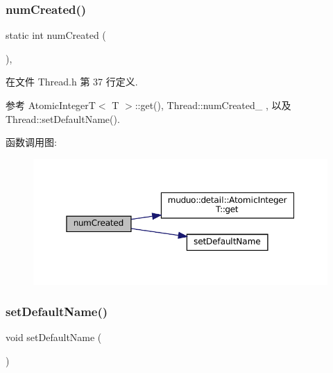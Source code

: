 \subsubsection{\texorpdfstring{num\+Created()}{numCreated()}}
{\footnotesize\ttfamily static int num\+Created (\begin{DoxyParamCaption}{ }\end{DoxyParamCaption})\hspace{0.3cm}{\ttfamily [inline]}, {\ttfamily [static]}}



在文件 Thread.\+h 第 37 行定义.



参考 Atomic\+Integer\+T$<$ T $>$\+::get(), Thread\+::num\+Created\+\_\+ , 以及 Thread\+::set\+Default\+Name().

函数调用图\+:
\nopagebreak
\begin{figure}[H]
\begin{center}
\leavevmode
\includegraphics[width=350pt]{classmuduo_1_1Thread_a2191877eb828575b4a698e5b1009923d_cgraph}
\end{center}
\end{figure}
\mbox{\label{classmuduo_1_1Thread_a7ac088202ebd97d9b4f69b46341a3142}} 
\subsubsection{\texorpdfstring{set\+Default\+Name()}{setDefaultName()}}
{\footnotesize\ttfamily void set\+Default\+Name (\begin{DoxyParamCaption}{ }\end{DoxyParamCaption})\hspace{0.3cm}{\ttfamily [private]}}



